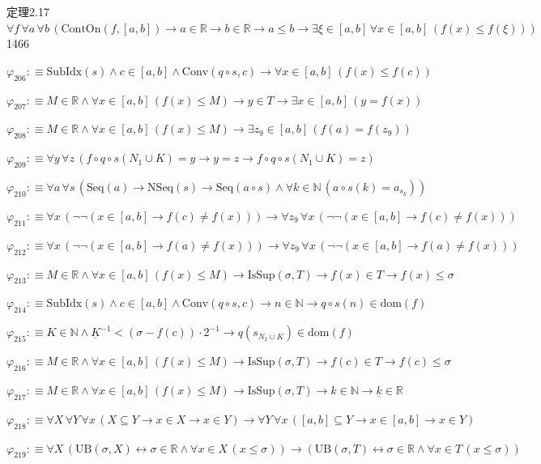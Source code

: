 \begin{fullproof}{定理2.17}{$\forall f\,\forall a\,\forall b\,(\mathrm{ContOn}(f,[a,b]) \to a \in \mathbb{R} \to b \in \mathbb{R} \to a \leq b \to \exists \xi \in [a,b]\,\forall x \in [a,b]\,(f(x) \leq f(\xi)))$}{1466}
\begin{abbrevlist}
\item $\varphi_{206} :\equiv \mathrm{SubIdx}(s) \land c \in [a,b] \land \mathrm{Conv}(q \circ s,c) \to \forall x \in [a,b]\,(f(x) \leq f(c))$
\item $\varphi_{207} :\equiv M \in \mathbb{R} \land \forall x \in [a,b]\,(f(x) \leq M) \to y \in T \to \exists x \in [a,b]\,(y = f(x))$
\item $\varphi_{208} :\equiv M \in \mathbb{R} \land \forall x \in [a,b]\,(f(x) \leq M) \to \exists z_{9} \in [a,b]\,(f(a) = f(z_{9}))$
\item $\varphi_{209} :\equiv \forall y\,\forall z\,(f \circ q \circ s(N_{1} \cup K) = y \to y = z \to f \circ q \circ s(N_{1} \cup K) = z)$
\item $\varphi_{210} :\equiv \forall a\,\forall s\,(\mathrm{Seq}(a) \to \mathrm{NSeq}(s) \to \mathrm{Seq}(a \circ s) \land \forall k \in \mathbb{N}\,(a \circ s(k) = a_{s_{k}}))$
\item $\varphi_{211} :\equiv \forall x\,(\neg \neg (x \in [a,b] \to f(c) \neq f(x))) \to \forall z_{9}\,\forall x\,(\neg \neg (x \in [a,b] \to f(c) \neq f(x)))$
\item $\varphi_{212} :\equiv \forall x\,(\neg \neg (x \in [a,b] \to f(a) \neq f(x))) \to \forall z_{9}\,\forall x\,(\neg \neg (x \in [a,b] \to f(a) \neq f(x)))$
\item $\varphi_{213} :\equiv M \in \mathbb{R} \land \forall x \in [a,b]\,(f(x) \leq M) \to \mathrm{IsSup}(\sigma,T) \to f(x) \in T \to f(x) \leq \sigma$
\item $\varphi_{214} :\equiv \mathrm{SubIdx}(s) \land c \in [a,b] \land \mathrm{Conv}(q \circ s,c) \to n \in \mathbb{N} \to q \circ s(n) \in \mathrm{dom}(f)$
\item $\varphi_{215} :\equiv K \in \mathbb{N} \land \underline{K}^{-1} < (\sigma - f(c)) \cdot 2^{-1} \to q(s_{N_{1} \cup K}) \in \mathrm{dom}(f)$
\item $\varphi_{216} :\equiv M \in \mathbb{R} \land \forall x \in [a,b]\,(f(x) \leq M) \to \mathrm{IsSup}(\sigma,T) \to f(c) \in T \to f(c) \leq \sigma$
\item $\varphi_{217} :\equiv M \in \mathbb{R} \land \forall x \in [a,b]\,(f(x) \leq M) \to \mathrm{IsSup}(\sigma,T) \to k \in \mathbb{N} \to \underline{k} \in \mathbb{R}$
\item $\varphi_{218} :\equiv \forall X\,\forall Y\,\forall x\,(X \subseteq Y \to x \in X \to x \in Y) \to \forall Y\,\forall x\,([a,b] \subseteq Y \to x \in [a,b] \to x \in Y)$
\item $\varphi_{219} :\equiv \forall X\,(\mathrm{UB}(\sigma,X) \leftrightarrow \sigma \in \mathbb{R} \land \forall x \in X\,(x \leq \sigma)) \to (\mathrm{UB}(\sigma,T) \leftrightarrow \sigma \in \mathbb{R} \land \forall x \in T\,(x \leq \sigma))$

\end{abbrevlist}
\end{fullproof}

